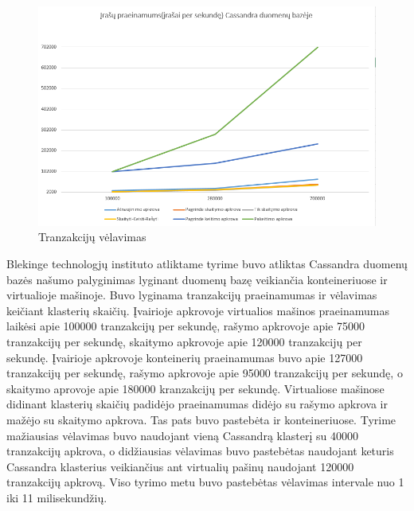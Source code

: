 \documentclass{VUMIFPSkursinis}
\begin{document}
		\begin{figure}[H]
		    \centering
		    \includegraphics[scale=0.5]{img/CasTp}
		    \caption{Tranzakcijų vėlavimas}   %
		    \label{img:mlp}
		\end{figure}
 			Blekinge technologjų instituto atliktame tyrime \cite{BITCass} buvo atliktas Cassandra duomenų bazės našumo palyginimas lyginant duomenų bazę  veikiančia konteineriuose ir virtualioje mašinoje. Buvo lyginama tranzakcijų praeinamumas ir vėlavimas keičiant klasterių skaičių. Įvairioje apkrovoje virtualios mašinos praeinamumas laikėsi apie 100000 tranzakcijų per sekundę, rašymo apkrovoje apie 75000 tranzakcijų per sekundę, skaitymo apkrovoje apie 120000 tranzakcijų per sekundę.
Įvairioje apkrovoje konteinerių praeinamumas buvo apie 127000 tranzakcijų per sekundę, rašymo apkrovoje apie 95000 tranzakcijų per sekundę, o skaitymo aprovoje apie 180000 kranzakcijų per sekundę. Virtualiose mašinose didinant klasterių skaičių padidėjo praeinamumas didėjo su rašymo apkrova ir mažėjo su skaitymo apkrova. Tas pats buvo pastebėta ir konteineriuose.
\newline
Tyrime mažiausias vėlavimas buvo naudojant vieną Cassandrą klasterį su 40000 tranzakcijų apkrova, o didžiausias vėlavimas buvo pastebėtas naudojant keturis Cassandra klasterius veikiančius ant virtualių pašinų naudojant 120000 tranzakcijų apkrovą. 
Viso tyrimo metu buvo pastebėtas vėlavimas intervale nuo 1 iki 11 milisekundžių.
			
\end{document}
